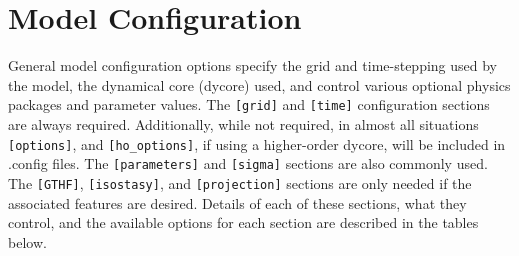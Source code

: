 \section{Model Configuration}\label{ug.sec.config}

General model configuration options 
specify the grid and time-stepping used by the model, 
the dynamical core (dycore) used, 
and control various optional physics packages and parameter values.
The \texttt{[grid]} and \texttt{[time]} configuration sections are always required.
Additionally, while not required, in almost all situations  \texttt{[options]}, 
 and \texttt{[ho\_options]}, if using a higher-order dycore, will be included in .config files.
The \texttt{[parameters]} and \texttt{[sigma]} sections are also commonly used.  
The \texttt{[GTHF]}, \texttt{[isostasy]}, and \texttt{[projection]} sections
are only needed if the associated features are desired.  Details of each of these
sections, what they control, and the available options for each section are described 
in the tables below.

